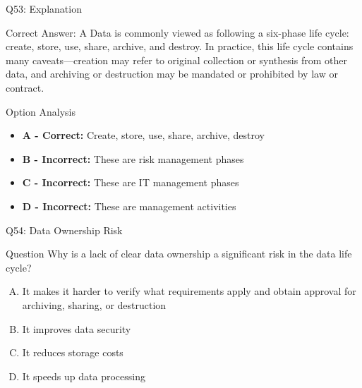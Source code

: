 \documentclass{beamer}
\begin{document}
	\begin{frame}{Q53: Explanation}
		\begin{block}{Correct Answer: A}
			Data is commonly viewed as following a six-phase life cycle: create, store, use, share, archive, and destroy. In practice, this life cycle contains many caveats—creation may refer to original collection or synthesis from other data, and archiving or destruction may be mandated or prohibited by law or contract.
		\end{block}
		\begin{block}{Option Analysis}
			\begin{itemize}
				\item \textbf{A - Correct:} Create, store, use, share, archive, destroy
				\item \textbf{B - Incorrect:} These are risk management phases
				\item \textbf{C - Incorrect:} These are IT management phases
				\item \textbf{D - Incorrect:} These are management activities
			\end{itemize}
		\end{block}
	\end{frame}
	
	\begin{frame}{Q54: Data Ownership Risk}
		\begin{block}{Question}
			Why is a lack of clear data ownership a significant risk in the data life cycle?
		\end{block}
		\begin{enumerate}[(A)]
			\item It makes it harder to verify what requirements apply and obtain approval for archiving, sharing, or destruction
			\item It improves data security
			\item It reduces storage costs
			\item It speeds up data processing
		\end{enumerate}
	\end{frame}
	
\end{document}
